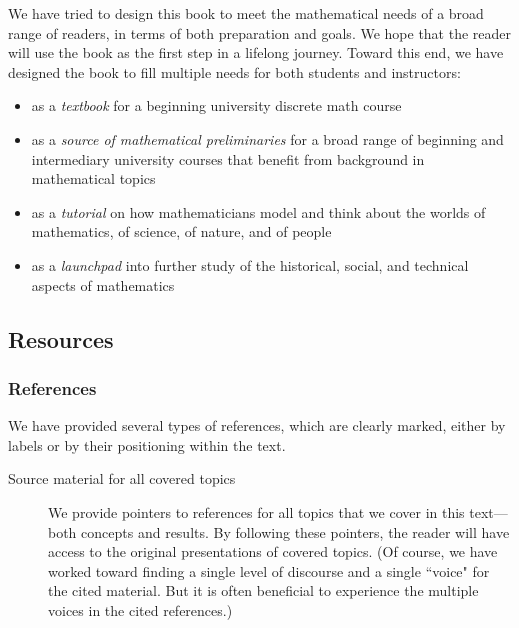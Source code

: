 We have tried to design this book to meet the mathematical needs of a broad range of readers, in terms of both preparation and goals.   We hope that the reader will use the book as the first step in a lifelong journey.  Toward this end, we have designed the book to fill multiple needs for both students and instructors:
  \begin{itemize}
  \item
as a {\em textbook} for a beginning university discrete math course

  \medskip\item
as a {\em source of mathematical preliminaries} for a broad range of beginning and intermediary university courses that benefit from background in mathematical topics

  \medskip\item
as a {\em tutorial} on how mathematicians model and think about the worlds of mathematics, of science, of nature, and of people

  \medskip\item
as a {\em launchpad} into further study of the historical, social, and technical aspects of mathematics
  \end{itemize}

\subsection{Resources}

\subsubsection{References}

We have provided several types of references, which are clearly marked, either by labels or by their positioning within the text.  
\begin{description}
\item[{\sc Source material for all covered topics}]
We provide pointers to references for all topics that we cover in this text---both concepts and results.  By following these pointers, the reader will have access to the original presentations of covered topics.  (Of course, we have worked toward finding a single level of discourse and a single ``voice" for the cited material.  But it is often beneficial to experience the multiple voices in the cited references.)
\end{description}

